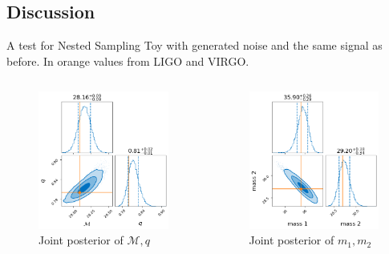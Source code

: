 \documentclass[
10pt,
aspectratio=169,
]{beamer}
\begin{document}
\subsection{Discussion}
\begin{frame}{A test for Nested Sampling}
Toy with generated noise and the same signal as before. In orange values from LIGO and VIRGO.
    \begin{columns}
        \begin{figure}
            \centering
            \includegraphics[width=0.8\columnwidth]{def_par.png}
            \caption{Joint posterior of $\mathcal{M},q$}
        \end{figure}
        \begin{figure}
            \centering
            \includegraphics[width=0.8\columnwidth]{mass_par_corr.png}
            \caption{Joint posterior of $m_1,m_2$}
        \end{figure}
    \end{columns}
\end{frame}
\end{document}
